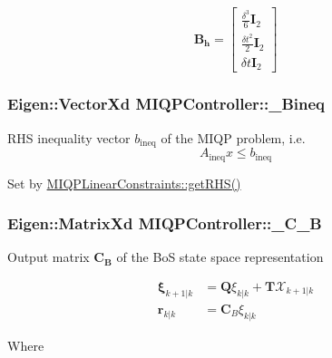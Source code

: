 \[ \mathbf{B_h} = \left[ \begin{array}{c} \frac{\delta^3}{6}\mathbf{I}_2 \\ \frac{\delta t^2}{2} \mathbf{I}_2 \\ \delta t \mathbf{I}_2 \end{array} \right] \] \hypertarget{classMIQPController_a02d441467a51e81e969163f096d3798a}{
\subsubsection[{\-\_\-\-Bineq}]{\setlength{\rightskip}{0pt plus 5cm}\-Eigen\-::\-Vector\-Xd {\bf \-M\-I\-Q\-P\-Controller\-::\-\_\-\-Bineq}}}\label{classMIQPController_a02d441467a51e81e969163f096d3798a}
\-R\-H\-S inequality vector $b_{\text{ineq}}$ of the \-M\-I\-Q\-P problem, i.\-e. \[ A_{\text{ineq}} x \leq b_{\text{ineq}} \]

\-Set by \hyperlink{classMIQPLinearConstraints_abf2bd3e8f0dfa5b919efa1b90b56232a}{\-M\-I\-Q\-P\-Linear\-Constraints\-::get\-R\-H\-S()} \hypertarget{classMIQPController_a5c6882cb248e9d16513868fea7835d6e}{
\subsubsection[{\-\_\-\-C\-\_\-\-B}]{\setlength{\rightskip}{0pt plus 5cm}\-Eigen\-::\-Matrix\-Xd {\bf \-M\-I\-Q\-P\-Controller\-::\-\_\-\-C\-\_\-\-B}}}\label{classMIQPController_a5c6882cb248e9d16513868fea7835d6e}
\-Output matrix $\mathbf{C_B}$ of the \-Bo\-S state space representation

\begin{align*} \mathbf{\xi}_{k+1|k} &= \mathbf{Q} \xi_{k|k} + \mathbf{T}\mathcal{X}_{k+1|k} \\ \mathbf{r}_{k|k} & =\mathbf{C}_B \xi_{k|k} \end{align*}

\-Where

